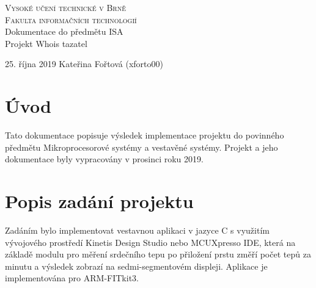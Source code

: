 \documentclass[a4paper, 11pt]{article}
\begin{document}
\begin{titlepage}
\begin{center}
\textsc{\Huge Vysoké učení technické v Brně\\ \medskip
\huge Fakulta informačních technologií}\\
\LARGE Dokumentace do předmětu ISA\\
\Huge  Projekt Whois tazatel\\
\begin{Large}
25. října 2019\hfill
Kateřina Fořtová (xforto00)
\end{Large}
\end{center}



\end{titlepage}

\tableofcontents
\newpage
\section{Úvod}
Tato dokumentace popisuje výsledek implementace projektu do povinného předmětu Mikroprocesorové systémy a vestavěné systémy. Projekt a jeho dokumentace byly vypracovány v prosinci roku 2019.
\section{Popis zadání projektu}
Zadáním bylo implementovat vestavnou aplikaci v jazyce C s využitím vývojového prostředí Kinetis Design Studio nebo MCUXpresso IDE, která na základě modulu pro měření srdečního tepu po přiložení prstu změří počet tepů za minutu a výsledek zobrazí na sedmi-segmentovém displeji. Aplikace je implementována pro ARM-FITkit3.
\end{document}
